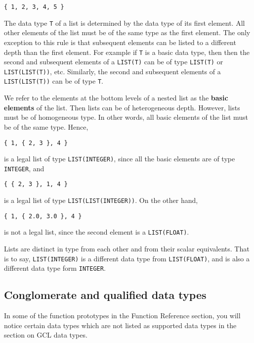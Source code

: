 \begin{verbatim}
{ 1, 2, 3, 4, 5 }
\end{verbatim}

\noindent 
The data type \verb+T+ of a list is determined by the data type of its
first element.  All other elements of the list must be of the same
type as the first element.  The only exception to this rule is that
subsequent elements can be listed to a different depth than the first
element.  For example if \verb+T+ is a basic data type, then then the
second and subsequent elements of a \verb+LIST(T)+ can be of type
\verb+LIST(T)+ or \verb+LIST(LIST(T))+, etc.  Similarly, the second
and subsequent elements of a \verb+LIST(LIST(T))+ can be of type
\verb+T+.  

We refer to the elements at the bottom levels of a nested list as the
{\bf basic elements} of the list.  Then lists can be of heterogeneous
depth.  However, lists must be of homogeneous type. In other words,
all basic elements of the list must be of the same type.  Hence,

\begin{verbatim}
{ 1, { 2, 3 }, 4 }
\end{verbatim}

\noindent 
is a legal list of type \verb+LIST(INTEGER)+, since all the basic
elements are of type {\tt INTEGER}, and 

\begin{verbatim}
{ { 2, 3 }, 1, 4 }
\end{verbatim}

\noindent 
is a legal list of type \verb+LIST(LIST(INTEGER))+.  On the other
hand, 

\begin{verbatim}
{ 1, { 2.0, 3.0 }, 4 }
\end{verbatim}

\noindent 
is not a legal list, since the second element is a {\tt LIST(FLOAT)}.

Lists are distinct in type from each other and from their scalar
equivalents.  That is to say, {\tt LIST(INTEGER)} is a different data
type from {\tt LIST(FLOAT)}, and is also a different data type form
{\tt INTEGER}.
 
\subsection{Conglomerate and qualified data types}

In some of the function prototypes in the Function Reference section,
you will notice certain data types which are not listed as supported
data types in the section on GCL data types. 

